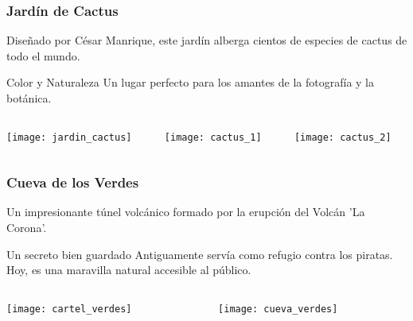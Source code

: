 \documentclass{beamer}
\begin{document}
	\begin{frame}
		\frametitle{Jardín de Cactus}
		Diseñado por César Manrique, este jardín alberga cientos de especies de cactus de todo el mundo.
		
		\begin{alertblock}{Color y Naturaleza}
			Un lugar perfecto para los amantes de la fotografía y la botánica.
		\end{alertblock}
		
		\begin{columns}[c]
			\begin{column}{0.33\textwidth}
				\centering
				\texttt{[image: jardin\_cactus]}
				\label{fig:jardin_cactus}
			\end{column}
			\begin{column}{0.33\textwidth}
				\centering
				\texttt{[image: cactus\_1]}
				\label{fig:cactus_1}
			\end{column}
			\begin{column}{0.33\textwidth}
				\centering
				\texttt{[image: cactus\_2]}
				\label{fig:cactus_2}
			\end{column}
		\end{columns}
		
	\end{frame}
	
	\begin{frame}
		\frametitle{Cueva de los Verdes}
		Un impresionante túnel volcánico formado por la erupción del Volcán 'La Corona'.
		
		\begin{block}{Un secreto bien guardado}
			Antiguamente servía como refugio contra los piratas. Hoy, es una maravilla natural accesible al público.
		\end{block}
		
		\begin{columns}[c]
			\begin{column}{0.5\textwidth}
				\centering
				\texttt{[image: cartel\_verdes]}
				\label{fig:cartel_verdes}
			\end{column}
			\begin{column}{0.5\textwidth}
				\centering
				\texttt{[image: cueva\_verdes]}
				\label{fig:cueva_verdes}
			\end{column}
		\end{columns}
	\end{frame}
	
	
	
\end{document}
